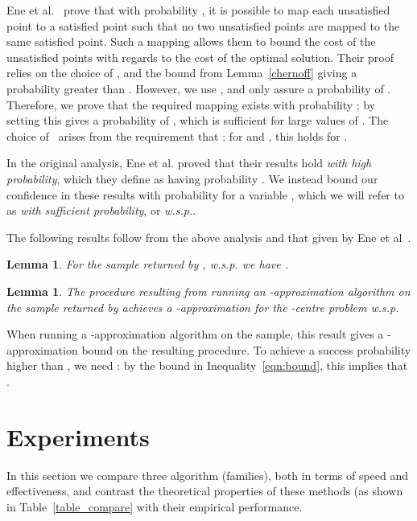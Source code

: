 \documentclass[11pt]{article}
\newtheorem{lemma}[theorem]{Lemma}
\begin{document}
Ene et al.~\cite{ene2011fast} prove that with probability , it is possible to map each unsatisfied point to a satisfied point such that no two unsatisfied points are mapped to the same satisfied point. 
Such a mapping allows them to bound the cost of the unsatisfied points with regards to the cost of the optimal solution. 
Their proof relies on the choice of , and the bound from Lemma~\ref{chernoff} giving a probability greater than . 
However, we use , and only assure a probability of . 
Therefore, we prove that the required mapping exists with probability ; by setting  this gives a probability of  , which is sufficient for large values of . 
The choice of~ arises from the requirement that :
for  and , this holds for . 


In the original analysis, Ene et al. proved that their results hold \emph{with high probability}, which they define as having probability .
We instead bound our confidence in these results with probability  for a variable , which we will refer to as \emph{with sufficient probability}, or \emph{w.s.p.}. 


The following results follow from the above analysis and that given by Ene et al~\cite{ene2011fast}. 

\begin{lemma}
For the sample  returned by ,
\emph{w.s.p.} we have .
\end{lemma}



\begin{lemma}
The procedure resulting from running an -approximation algorithm on the sample returned by   achieves a -approximation for the -centre problem   \emph{w.s.p.}
\end{lemma}


When running a -approximation algorithm on the sample, this result gives a -approximation bound on the resulting procedure. 
To achieve a success probability higher than , we need : by
the bound in Inequality~\eqref{eqn:bound}, this implies that .



\section{Experiments}

In this section we compare three algorithm (families), both in terms of speed
and effectiveness, and contrast the theoretical properties of these methods
(as shown in Table~\ref{table_compare}
with their empirical performance.
\end{document}
